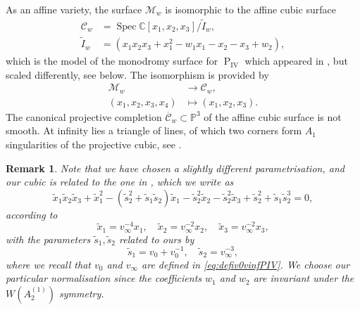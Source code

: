 \documentclass[a4paper,reqno]{amsart}
\numberwithin{equation}{section}
\newcommand{\C}{\mathbb{C}}
\newcommand{\p}{\mathbb{P}}
\newcommand{\pain}[1]{\operatorname{P}_{\mathrm{#1}}}
\DeclareMathOperator{\Spec}{Spec}
\newtheorem{remark}[theorem]{Remark}
\numberwithin{equation}{section}
\begin{document}
As an affine variety, the surface $\mathcal{M}_w$ is isomorphic to the affine cubic surface
\begin{equation}\label{eq:affinecubicPIV}
    \begin{aligned}
        \mathcal{C}_w &= \Spec \C[x_1,x_2,x_3]/\tilde{I}_w, \\  
        \tilde{I}_w &= (x_1 x_2 x_3+x_1^2 -w_1 x_1 -x_2-x_3 +w_2),
    \end{aligned}
\end{equation}
which is the model of the monodromy surface for $\pain{IV}$ which appeared in \cite[Sec. 3.7]{putsaito}, but scaled differently, see  below.
The isomorphism is provided by
\begin{equation} \label{eq:isomsegretocubicPIV}
\begin{aligned}
    \mathcal{M}_w &\to \mathcal{C}_w, \\
    (x_1,x_2,x_3,x_4) &\mapsto (x_1,x_2,x_3). 
\end{aligned}
\end{equation}
The canonical projective completion $\overline{\mathcal{C}}_w\subset \p^3$ of the affine cubic surface is not smooth. 
At infinity lies a triangle of lines, of which two corners form $A_1$ singularities of the projective cubic, see \cite[Table 4]{JMR}.


\begin{remark}\label{rem:comparisonpivPS}
Note that we have chosen a slightly different parametrisation, and our cubic is related to the one in \cite{putsaito}, which we write as 
\begin{equation*}
\tilde{x}_1\tilde{x}_2\tilde{x}_3 + \tilde{x}_1^2 - \left(\tilde{s}_2^2+\tilde{s}_1\tilde{s}_2\right)\tilde{x}_1-\tilde{s}_2^2 \tilde{x}_2 - \tilde{s}_2^2 \tilde{x}_3+\tilde{s}_2^2+\tilde{s}_1\tilde{s}_2^3 = 0, 
\end{equation*}
according to
\begin{equation*}
    \tilde{x}_1= v_{\infty}^{-4} x_1, \quad 
    \tilde{x}_2= v_{\infty}^{-2} x_2, \quad 
    \tilde{x}_3= v_{\infty}^{-2} x_3,
\end{equation*}
with the parameters $\tilde{s}_1,\tilde{s}_2$ related to ours by
\begin{equation*}
    \tilde{s}_1 =v_0+v_0^{-1},\quad 
    \tilde{s}_2 = v_\infty^{-3},
\end{equation*}
where we recall that $v_0$ and $v_\infty$ are defined in \eqref{eq:defiv0vinfPIV}.
We choose our particular normalisation since the coefficients $w_1$ and $w_2$ are invariant under the $W(A_2^{(1)})$ symmetry. 
\end{remark}
\end{document}
